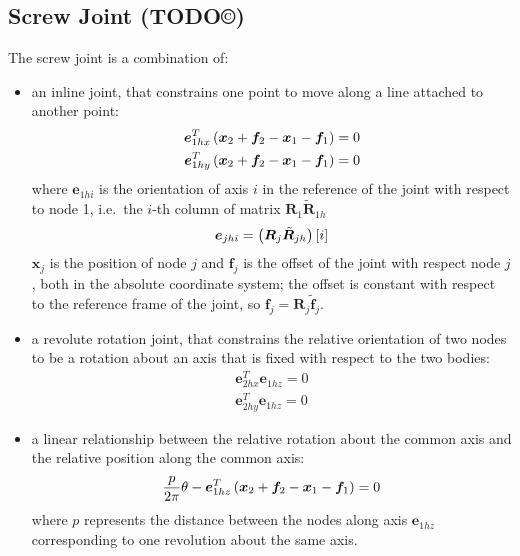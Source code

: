 \documentclass[10pt,dvips,fleqn,subeqn]{report}
\newcommand{\T}[1]{\bm{#1}}
\begin{document}
\subsection{Screw Joint (TODO\copyright)}
The screw joint is a combination of:
\begin{itemize}
\item an inline joint, that constrains one point to move along 
a line attached to another point:
\begin{align*}
	\T{e}_{1hx}^T\plbr{\T{x}_2 + \T{f}_2 - \T{x}_1 - \T{f}_1} &= 0 \\
	\T{e}_{1hy}^T\plbr{\T{x}_2 + \T{f}_2 - \T{x}_1 - \T{f}_1} &= 0
\end{align*}
where $\T{e}_{1hi}$ is the orientation of axis $i$ in the reference
of the joint with respect to node 1, i.e.\ the $i$-th column of matrix
$\T{R}_1 \tilde{\T{R}}_{1h}$
\begin{equation}
	\T{e}_{jhi} = \plbr{\T{R}_j \tilde{\T{R}}_{jh}}\sqbr{i}
\end{equation}
$\T{x}_j$ is the position of node $j$
and $\T{f}_j$ is the offset of the joint with respect node $j$,
both in the absolute coordinate system; the offset is constant
with respect to the reference frame of the joint,
so $\T{f}_j=\T{R}_j\tilde{\T{f}}_j$.

\item a revolute rotation joint, that constrains the relative
orientation of two nodes to be a rotation about an axis that
is fixed with respect to the two bodies:
\begin{align*}
	\T{e}_{2hx}^T \T{e}_{1hz} = 0 \\
	\T{e}_{2hy}^T \T{e}_{1hz} = 0
\end{align*}

\item a linear relationship between the relative rotation
about the common axis and the relative position along the common axis:
\begin{equation}
	\label{eq:SCREW-constraint}
	\frac{p}{2 \pi} \theta - \T{e}_{1hz}^T\plbr{\T{x}_2 + \T{f}_2 - \T{x}_1 - \T{f}_1} = 0
\end{equation}
where $p$ represents the distance between the nodes 
along axis $\T{e}_{1hz}$ corresponding to one revolution 
about the same axis.
\end{itemize}
\end{document}
